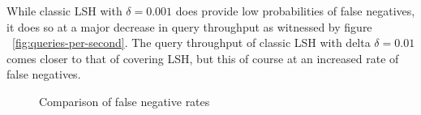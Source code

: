 While classic LSH with $\delta = 0.001$ does provide low probabilities of false negatives, it does so at a major decrease in query throughput as witnessed by figure ~\ref{fig:queries-per-second}. The query throughput of classic LSH with delta $\delta = 0.01$ comes closer to that of covering LSH, but this of course at an increased rate of false negatives.

\begin{figure}[ht]
  \centering

  \caption{Comparison of false negative rates}
  \label{fig:false-negatives-per-query}
\end{figure}
